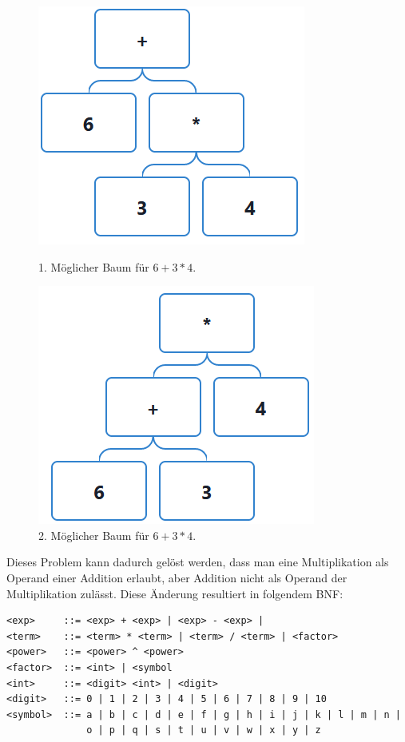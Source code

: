 \documentclass[11pt]{article}
\begin{document}
\begin{figure}[h]
\begin{minipage}{.5\textwidth}
  \centering
  \includegraphics[scale=0.5]{trees/beispiel_bnf_2_1.png}
  \caption{1. Möglicher Baum für $6+3*4$.}
\end{minipage}
\begin{minipage}{.5\textwidth}
  \centering
  \includegraphics[scale=0.5]{trees/beispiel_bnf_2_2.png}
  \caption{2. Möglicher Baum für $6+3*4$.}
\end{minipage}
\end{figure}

Dieses Problem kann dadurch gelöst werden, dass man eine Multiplikation als 
Operand einer Addition erlaubt, aber Addition nicht als Operand der Multiplikation 
zulässt. Diese Änderung resultiert in folgendem BNF:

\begin{verbatim}
<exp>     ::= <exp> + <exp> | <exp> - <exp> | 
<term>    ::= <term> * <term> | <term> / <term> | <factor>
<power>   ::= <power> ^ <power>
<factor>  ::= <int> | <symbol 
<int>     ::= <digit> <int> | <digit>
<digit>   ::= 0 | 1 | 2 | 3 | 4 | 5 | 6 | 7 | 8 | 9 | 10
<symbol>  ::= a | b | c | d | e | f | g | h | i | j | k | l | m | n | 
              o | p | q | s | t | u | v | w | x | y | z
\end{verbatim}
\end{document}
